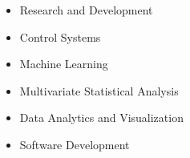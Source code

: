

\begin{cvexpertise}
  \begin{itemize}
    \item Research and Development
    \item Control Systems
    \item Machine Learning
    \vfill
    \item Multivariate Statistical Analysis
    \item Data Analytics and Visualization
    \item Software Development
  \end{itemize}
\end{cvexpertise}

